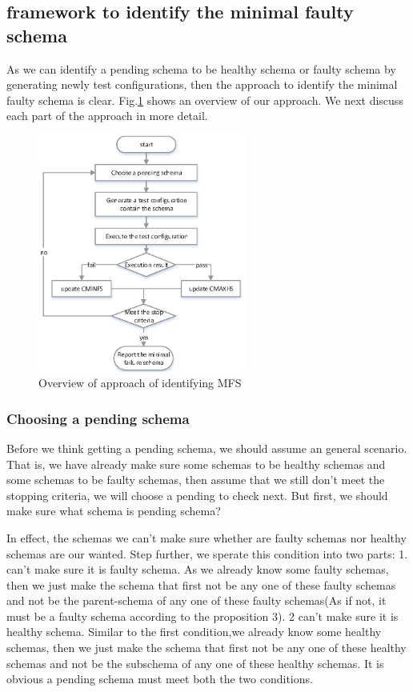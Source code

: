 \documentclass[10pt,journal,cspaper,compsoc]{IEEEtran}
\begin{document}
\subsection{framework to identify the minimal faulty schema}
As we can identify a pending schema to be healthy schema or faulty schema by generating newly test configurations, then the approach to identify the minimal faulty schema is clear. Fig.\ref{fig_overview} shows an overview of our approach. We next discuss each part of the approach in more detail.
\begin{figure}
 \centering
 \includegraphics[width=2.7in]{gp.eps}
 \caption{Overview of approach of identifying MFS}
 \label{fig_overview}
\end{figure}
\subsubsection{Choosing a pending schema}
Before we think getting a pending schema, we should assume an general scenario. That is, we have already make sure some schemas to be healthy schemas and some schemas to be faulty schemas, then assume that we still don't meet the stopping criteria, we will choose a pending to check next. But first, we should make sure what schema is pending schema?

In effect, the schemas we can't make sure whether are faulty schemas nor healthy schemas are our wanted. Step further, we sperate this condition into two parts: 1. can't make sure it is faulty schema. As we already know some faulty schemas, then we just make the schema that first not be any one of these faulty schemas and not be the parent-schema of any one of these faulty schemas(As if not, it must be a faulty schema according to the proposition 3). 2 can't make sure it is healthy schema. Similar to the first condition,we already know some healthy schemas, then we just make the schema that first not be any one of these healthy schemas and not be the subschema of any one of these healthy schemas. It is obvious a pending schema must meet both the two conditions.
\end{document}
